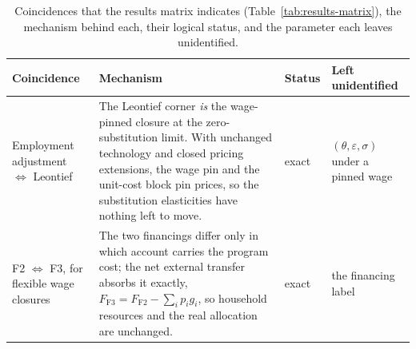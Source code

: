 \begin{table}[htbp]
\centering
\footnotesize
\setlength{\tabcolsep}{5pt}
\renewcommand{\arraystretch}{1.25}
\begin{tabular}{@{}>{\raggedright\arraybackslash}p{3.3cm}
                  >{\raggedright\arraybackslash}p{5.5cm}
                  >{\raggedright\arraybackslash}p{2.1cm}
                  >{\raggedright\arraybackslash}p{2.8cm}@{}}
\toprule
Coincidence & Mechanism & Status & Left unidentified \\
\midrule
Employment adjustment $\Leftrightarrow$ Leontief
& The Leontief corner \emph{is} the wage-pinned closure at the
  zero-substitution limit. With unchanged technology and closed pricing
  extensions, the wage pin and the unit-cost block pin prices, so the
  substitution elasticities have nothing left to move.
& exact
& $(\theta,\varepsilon,\sigma)$ under a pinned wage \\[3pt]
F2 $\Leftrightarrow$ F3, for flexible wage closures
& The two financings differ only in which account carries the program
  cost; the net external transfer absorbs it exactly,
  $F_{\mathrm{F3}} = F_{\mathrm{F2}} - \sum_i p_i g_i$, so household resources
  and the real allocation are unchanged.
& exact
& the financing label \\
\bottomrule
\end{tabular}
\caption{Coincidences that the results matrix indicates
(Table~\ref{tab:results-matrix}), the mechanism behind each, their logical
status, and the parameter each leaves unidentified.}
\label{tab:equiv-matrix}
\end{table}
